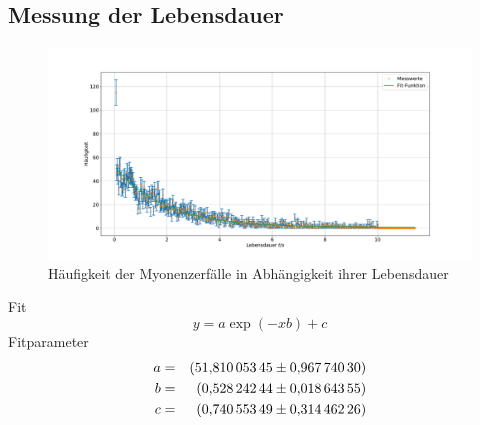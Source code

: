 \FloatBarrier

\subsection{Messung der Lebensdauer}
\begin{figure}[h!]
  \centering
  \includegraphics[width=\textwidth]{figmyonen.pdf}
  \caption{Häufigkeit der Myonenzerfälle in Abhängigkeit ihrer Lebensdauer}
  \label{fig:myonen}
\end{figure}
Fit
\begin{equation*}
y = a \exp{(-x b)}+c
\end{equation*}
Fitparameter
\begin{align*}
a  &=&  \SI{51.81005345 \pm 0.9677403}{}\\
b  &=&  \SI{0.52824244 \pm 0.01864355}{}\\
c  &=&  \SI{0.74055349 \pm 0.31446226}{}\\
\end{align*}
\FloatBarrier
